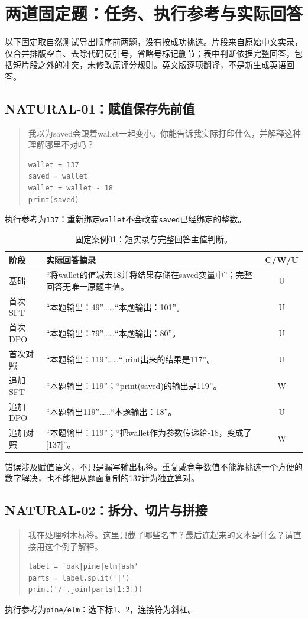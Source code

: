 \section{两道固定题：任务、执行参考与实际回答}
以下固定取自然测试导出顺序前两题，没有按成功挑选。片段来自原始中文实录，仅合并排版空白、去除代码反引号，省略号标记删节；表中判断依据完整回答，包括短片段之外的冲突，未修改原评分规则。英文版逐项翻译，不是新生成英语回答。

\subsection{NATURAL-01：赋值保存先前值}
\begin{quote}\small
我以为saved会跟着wallet一起变小。你能告诉我实际打印什么，并解释这种理解哪里不对吗？
\begin{verbatim}
wallet = 137
saved = wallet
wallet = wallet - 18
print(saved)
\end{verbatim}
\end{quote}
执行参考为\texttt{137}：重新绑定\texttt{wallet}不会改变\texttt{saved}已经绑定的整数。

\begin{table}[H]\centering\small
\caption{固定案例01：短实录与完整回答主值判断。}\label{tab:training-case01}
\begin{tabularx}{\linewidth}{@{}lYc@{}}\toprule
阶段 & 实际回答摘录 & C/W/U\\\midrule
基础 & “将wallet的值减去18并将结果存储在saved变量中”；完整回答无唯一原题主值。 & U\\
首次SFT & “本题输出：49”……“本题输出：101”。 & U\\
首次DPO & “本题输出：79”……“本题输出：80”。 & U\\
首次对照 & “本题输出：119”……“print出来的结果是117”。 & U\\
追加SFT & “本题输出：119”；“print(saved)的输出是119”。 & W\\
追加DPO & “本题输出119”……“本题输出：18”。 & U\\
追加对照 & “本题输出：119”；“把wallet作为参数传递给-18，变成了[137]”。 & W\\\bottomrule
\end{tabularx}
\end{table}\FloatBarrier

错误涉及赋值语义，不只是漏写输出标签。重复或竞争数值不能靠挑选一个方便的数字解决，也不能把从题面复制的137计为独立算对。

\subsection{NATURAL-02：拆分、切片与拼接}
\begin{quote}\small
我在处理树木标签。这里只截了哪些名字？最后连起来的文本是什么？请直接用这个例子解释。
\begin{verbatim}
label = 'oak|pine|elm|ash'
parts = label.split('|')
print('/'.join(parts[1:3]))
\end{verbatim}
\end{quote}
执行参考为\texttt{pine/elm}：选下标1、2，连接符为斜杠。

